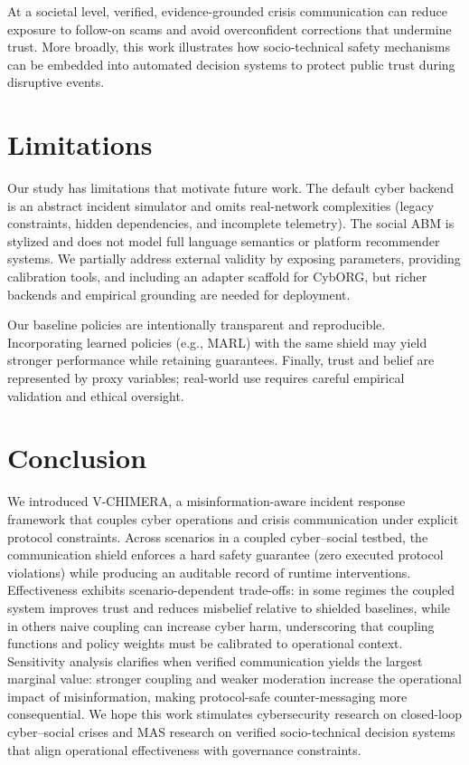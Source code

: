 \documentclass[sn-basic]{sn-jnl}
\newcommand{\model}{V-CHIMERA}
\begin{document}
At a societal level, verified, evidence-grounded crisis communication can reduce exposure to follow-on scams and avoid overconfident corrections that undermine trust. More broadly, this work illustrates how socio-technical safety mechanisms can be embedded into automated decision systems to protect public trust during disruptive events.

\section{Limitations}
Our study has limitations that motivate future work. The default cyber backend is an abstract incident simulator and omits real-network complexities (legacy constraints, hidden dependencies, and incomplete telemetry). The social ABM is stylized and does not model full language semantics or platform recommender systems. We partially address external validity by exposing parameters, providing calibration tools, and including an adapter scaffold for CybORG, but richer backends and empirical grounding are needed for deployment.

Our baseline policies are intentionally transparent and reproducible. Incorporating learned policies (e.g., MARL) with the same shield may yield stronger performance while retaining guarantees. Finally, trust and belief are represented by proxy variables; real-world use requires careful empirical validation and ethical oversight.

\section{Conclusion}
We introduced \model{}, a misinformation-aware incident response framework that couples cyber operations and crisis communication under explicit protocol constraints. Across scenarios in a coupled cyber--social testbed, the communication shield enforces a hard safety guarantee (zero executed protocol violations) while producing an auditable record of runtime interventions. Effectiveness exhibits scenario-dependent trade-offs: in some regimes the coupled system improves trust and reduces misbelief relative to shielded baselines, while in others naive coupling can increase cyber harm, underscoring that coupling functions and policy weights must be calibrated to operational context. Sensitivity analysis clarifies when verified communication yields the largest marginal value: stronger coupling and weaker moderation increase the operational impact of misinformation, making protocol-safe counter-messaging more consequential. We hope this work stimulates cybersecurity research on closed-loop cyber--social crises and MAS research on verified socio-technical decision systems that align operational effectiveness with governance constraints.
\end{document}
